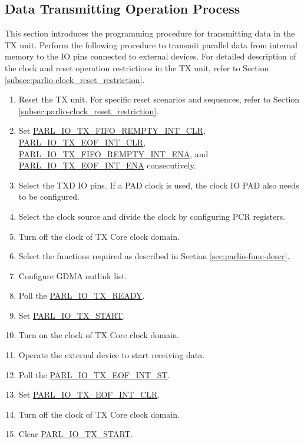 \documentclass[main\_\_EN.tex]{subfiles}
\begin{document}
\subsection{Data Transmitting Operation Process}
This section introduces the programming procedure for transmitting data in the TX unit. Perform the following procedure to transmit parallel data from internal memory to the IO pins connected to external devices. For detailed description of the clock and reset operation restrictions in the TX unit, refer to Section \ref{subsec:parlio-clock_reset_restriction}.
\begin{enumerate}
    \item Reset the TX unit. For specific reset scenarios and sequences, refer to Section \ref{subsec:parlio-clock_reset_restriction}.
    \item Set \hyperref[fielddesc:PARLIOTXFIFOREMPTYINTCLR]{PARL\_IO\_TX\_FIFO\_REMPTY\_INT\_CLR}, \hyperref[fielddesc:PARLIOTXEOFINTCLR]{PARL\_IO\_TX\_EOF\_INT\_CLR}, \hyperref[fielddesc:PARLIOTXFIFOREMPTYINTENA]{PARL\_IO\_TX\_FIFO\_REMPTY\_INT\_ENA}, and \hyperref[fielddesc:PARLIOTXEOFINTENA]{PARL\_IO\_TX\_EOF\_INT\_ENA} consecutively. 
    \item Select the TXD IO pins. If a PAD clock is used, the clock IO PAD also needs to be configured. 
    \item Select the clock source and  divide the clock by configuring PCR registers.
    \item Turn off the clock of TX Core clock domain.
    \item Select the functions required as described in Section \ref{sec:parlio-func-descr}.
    \item Configure GDMA outlink list.
    \item Poll the \hyperref[fielddesc:PARLIOTXREADY]{PARL\_IO\_TX\_READY}.
    \item Set \hyperref[fielddesc:PARLIOTXSTART]{PARL\_IO\_TX\_START}.
    \item Turn on the clock of TX Core clock domain.
    \item Operate the external device to start receiving data.
    \item Poll the \hyperref[fielddesc:PARLIOTXEOFINTST]{PARL\_IO\_TX\_EOF\_INT\_ST}.
    \item Set \hyperref[fielddesc:PARLIOTXEOFINTCLR]{PARL\_IO\_TX\_EOF\_INT\_CLR}.
    \item Turn off the clock of TX Core clock domain.
    \item Clear \hyperref[fielddesc:PARLIOTXSTART]{PARL\_IO\_TX\_START}.
\end{enumerate}
\end{document}
